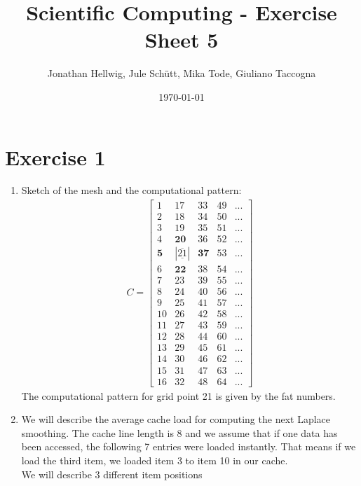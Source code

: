 \documentclass{article}
\title{Scientific Computing - Exercise Sheet 5}
\author{Jonathan Hellwig, Jule Schütt, Mika Tode, Giuliano Taccogna}
\date{\today}
\begin{document}
\maketitle

\section{Exercise 1}
\begin{enumerate}[label=(\alph*)]
    \item Sketch of the mesh and the computational pattern:
	    \begin{align*}
        C=\left[\begin{matrix}
            1 & 17 & 33 & 49 & ...\\
            2 & 18 & 34 & 50 & ... \\
            3 & 19 & 35 & 51 & ... \\
            4 & \textbf{20} & 36 & 52 & ... \\
            \textbf{5} & |\overline{\underline{21}}| & \textbf{37} & 53 & ...\\
            6 & \textbf{22} & 38 & 54 & ... \\
            7 & 23 & 39 & 55 & ...\\
            8 & 24 & 40 & 56 & ... \\
            9 & 25 & 41 & 57 & ... \\
            10 & 26 & 42 & 58 & ... \\
	11 & 27 & 43 & 59  & ... \\
	12 & 28 & 44 & 60  & ... \\
	13 & 29 & 45 & 61  & ... \\
	14 & 30 & 46 & 62  & ... \\
	15 & 31 & 47 & 63  & ... \\
	16 & 32 & 48 & 64  & ... 
        \end{matrix}\right]
    \end{align*}
The computational pattern for grid point 21 is given by the fat numbers.    
    \item
    We will describe the average cache load for computing the next Laplace smoothing. The cache line length is 8 and we assume that if one data has been accessed, the following 7 entries were loaded instantly. That means if we load the third item, we loaded item 3 to item 10 in our cache. \\
    We will describe 3 different item positions
    \begin{itemize}

\end{itemize}
\end{enumerate}
\end{document}
